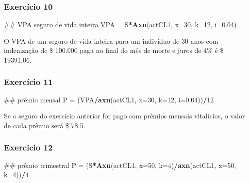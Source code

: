 \documentclass[]{article}
\newenvironment{Shaded}{\begin{snugshade}}{\end{snugshade}}
\newcommand{\DataTypeTok}[1]{\textcolor[rgb]{0.13,0.29,0.53}{#1}}
\newcommand{\DecValTok}[1]{\textcolor[rgb]{0.00,0.00,0.81}{#1}}
\newcommand{\FloatTok}[1]{\textcolor[rgb]{0.00,0.00,0.81}{#1}}
\newcommand{\KeywordTok}[1]{\textcolor[rgb]{0.13,0.29,0.53}{\textbf{#1}}}
\newcommand{\NormalTok}[1]{#1}
\newcommand{\OperatorTok}[1]{\textcolor[rgb]{0.81,0.36,0.00}{\textbf{#1}}}
\newcommand{\StringTok}[1]{\textcolor[rgb]{0.31,0.60,0.02}{#1}}
\begin{document}
\hypertarget{exercicio-10}{%
\subsubsection{Exercício 10}\label{exercicio-10}}

\begin{Shaded}
\begin{Highlighting}[]
\NormalTok{## VPA seguro de vida inteira}
\NormalTok{VPA =}\StringTok{ }\NormalTok{S}\OperatorTok{*}\KeywordTok{Axn}\NormalTok{(actCL1, }\DataTypeTok{x=}\DecValTok{30}\NormalTok{, }\DataTypeTok{k=}\DecValTok{12}\NormalTok{, }\DataTypeTok{i=}\FloatTok{0.04}\NormalTok{)}
\end{Highlighting}
\end{Shaded}

O VPA de um seguro de vida inteira para um indivíduo de 30 anos com
indenização de \$ 100.000 paga no final do mês de morte e juros de 4\% é
\$ 19391.06.

\hypertarget{exercicio-11}{%
\subsubsection{Exercício 11}\label{exercicio-11}}

\begin{Shaded}
\begin{Highlighting}[]
\NormalTok{## prêmio mensal}
\NormalTok{P =}\StringTok{ }\NormalTok{(VPA}\OperatorTok{/}\KeywordTok{axn}\NormalTok{(actCL1, }\DataTypeTok{x=}\DecValTok{30}\NormalTok{, }\DataTypeTok{k=}\DecValTok{12}\NormalTok{, }\DataTypeTok{i=}\FloatTok{0.04}\NormalTok{))}\OperatorTok{/}\DecValTok{12}
\end{Highlighting}
\end{Shaded}

Se o seguro do exercício anterior for pago com prêmios mensais
vitalícios, o valor de cada prêmio será \$ 78.5.

\hypertarget{exercicio-12}{%
\subsubsection{Exercício 12}\label{exercicio-12}}

\begin{Shaded}
\begin{Highlighting}[]
\NormalTok{## prêmio trimestral}
\NormalTok{P =}\StringTok{ }\NormalTok{(S}\OperatorTok{*}\KeywordTok{Axn}\NormalTok{(actCL1, }\DataTypeTok{x=}\DecValTok{50}\NormalTok{, }\DataTypeTok{k=}\DecValTok{4}\NormalTok{)}\OperatorTok{/}\KeywordTok{axn}\NormalTok{(actCL1, }\DataTypeTok{x=}\DecValTok{50}\NormalTok{, }\DataTypeTok{k=}\DecValTok{4}\NormalTok{))}\OperatorTok{/}\DecValTok{4}
\end{Highlighting}
\end{Shaded}
\end{document}
